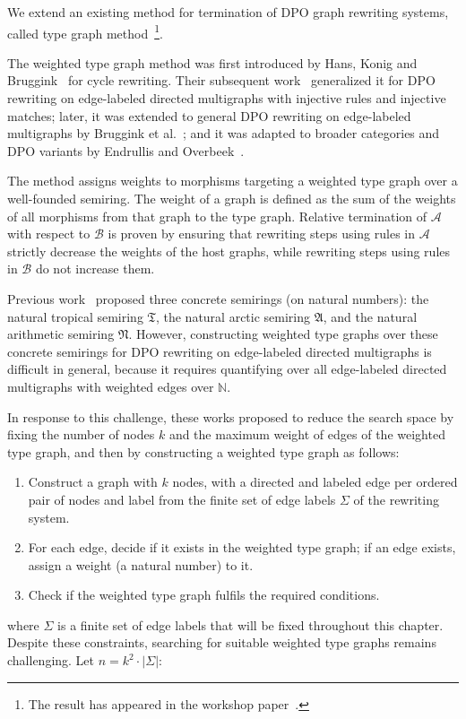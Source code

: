 We extend an existing method for termination of DPO graph rewriting systems, called type graph method~\footnote{The result has appeared in the workshop paper~\cite{qiu2025termination_nwf_v2_acceptedgcm}.}.

The weighted type graph method was first introduced by Hans, Konig and Bruggink~\cite{zantema2014termination} for cycle rewriting. Their subsequent work~\cite{bruggink2014termination} generalized it for DPO rewriting on edge-labeled directed multigraphs with injective rules and injective matches; later, it was extended to general DPO rewriting on edge-labeled multigraphs by Bruggink et al.~\cite{bruggink2015proving}; and it was adapted to broader categories and DPO variants by Endrullis and Overbeek~\cite{endrullis2024generalized_icgt}. 

The method assigns weights to morphisms targeting a weighted type graph over a well-founded semiring. The weight of a graph is defined
 as the sum of the weights of all morphisms from that graph to the type graph. Relative termination of $\mathcal{A}$ with respect to $\mathcal{B}$ is proven by ensuring that rewriting steps using rules in \( \mathcal{A} \) strictly decrease the weights of the host graphs, while rewriting steps using rules in \( \mathcal{B} \) do not increase them.
    
   Previous work~\cite{zantema2014termination,bruggink2014termination,bruggink2015proving} proposed three concrete semirings (on natural numbers): the natural tropical semiring $\mathfrak{T}$, the natural arctic semiring $\mathfrak{A}$, and the natural arithmetic semiring $\mathfrak{N}$.
    However, constructing weighted type graphs over these concrete semirings for DPO rewriting on edge-labeled directed multigraphs is difficult in general, because it requires quantifying over all edge-labeled directed multigraphs with weighted edges over $\mathbb{N}$.

    In response to this challenge, these works proposed to reduce the search space by fixing the number of nodes \( k\) and the maximum weight of edges of the weighted type graph, and then by constructing a weighted type graph as follows: 
    \begin{enumerate}
      \item Construct a graph with \( k \) nodes, with a directed and labeled edge per ordered pair of nodes and label from the finite set of edge labels $\Sigma$ of the rewriting system. 
      \item For each edge, decide if it exists in the weighted type graph;  if an edge exists, assign a weight (a natural number) to it.
      \item Check if the weighted type graph fulfils the required conditions.
    \end{enumerate}
    where $\Sigma$ is a finite set of edge labels that will be fixed throughout this chapter.
    Despite these constraints, searching for suitable weighted type graphs
    remains challenging. 
    Let $n = k^2 \cdot | \Sigma |$:
    
